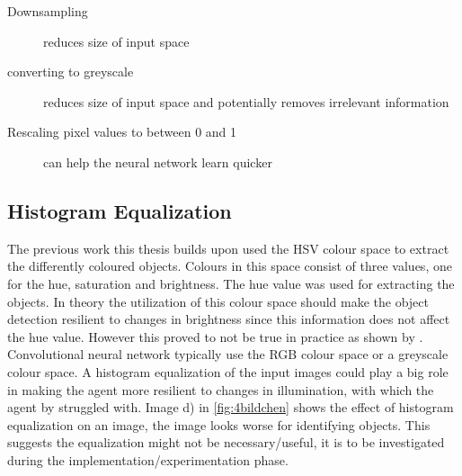 \begin{description}
     \item[Downsampling] reduces size of input space
     \item[converting to greyscale] reduces size of input space and potentially removes irrelevant information
     \item[Rescaling pixel values to between 0 and 1] can help the neural network learn quicker %
\end{description}


\subsection{Histogram Equalization}

The previous work this thesis builds upon used the HSV colour space to extract the differently coloured objects. Colours in this space consist of three values, one for the hue, saturation and brightness. The hue value was used for extracting the objects. In theory the utilization of this colour space should make the object detection resilient to changes in brightness since this information does not affect the hue value. However this proved to not be true in practice as shown by \autocite{maximilian}.
Convolutional neural network typically use the RGB colour space or a greyscale colour space. A histogram equalization of the input images could play a big role in making the agent more resilient to changes in illumination, with which the agent by \autocite{maximilian} struggled with. Image d) in \ref{fig:4bildchen} shows the effect of histogram equalization on an image, the image looks worse for identifying objects. This suggests the equalization might not be necessary/useful, it is to be investigated during the implementation/experimentation phase.




